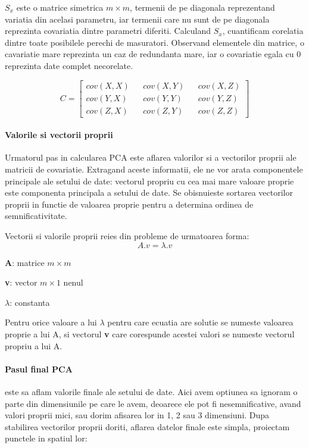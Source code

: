 \documentclass[12pt,oneside]{article}
\begin{document}
$S_x$ este o matrice simetrica $m \times m$, termenii de pe diagonala reprezentand variatia din acelasi parametru, iar termenii care nu sunt de pe diagonala reprezinta covariatia dintre parametri diferiti. Calculand $S_x$, cuantificam corelatia dintre toate posibilele perechi de masuratori. Observand elementele din matrice, o cavariatie mare reprezinta un caz de redundanta mare, iar o covariatie egala cu 0 reprezinta date complet necorelate.

\begin{equation}
C=\begin{bmatrix}
cov(X,X) && cov(X,Y) && cov(X,Z) \\
cov(Y,X) && cov(Y,Y) && cov(Y,Z) \\
cov(Z,X) && cov(Z,Y) && cov(Z,Z)
\end{bmatrix}
\end{equation}


\paragraph{Valorile si vectorii proprii}
Urmatorul pas in calcularea PCA este aflarea valorilor si a vectorilor proprii ale matricii de covariatie. Extragand aceste informatii, ele ne vor arata componentele principale ale setului de date: vectorul propriu cu cea mai mare valoare proprie este componenta principala a setului de date. Se obisnuieste sortarea vectorilor proprii in functie de valoarea proprie pentru a determina ordinea de semnificativitate.

Vectorii si valorile proprii reies din probleme de urmatoarea forma:
\begin{equation}
A.v= \lambda . v
\end{equation}

\textbf{A}: matrice $m \times m$


\textbf{v}: vector $m \times 1$  nenul


$\lambda$: constanta

Pentru orice valoare a lui $\lambda$ pentru care ecuatia are solutie se numeste valoarea proprie a lui A, si vectorul \textbf{v} care corespunde acestei valori se numeste vectorul propriu a lui A.

\paragraph{Pasul final PCA} este sa aflam valorile finale ale setului de date. Aici avem optiunea sa ignoram o parte din dimensiunile pe care le avem, deoarece ele pot fi nesemnificative, avand valori proprii mici, sau dorim afisarea lor in 1, 2 sau 3 dimensiuni. Dupa stabilirea vectorilor proprii doriti, aflarea datelor finale este simpla, proiectam punctele in spatiul lor: 
\end{document}
